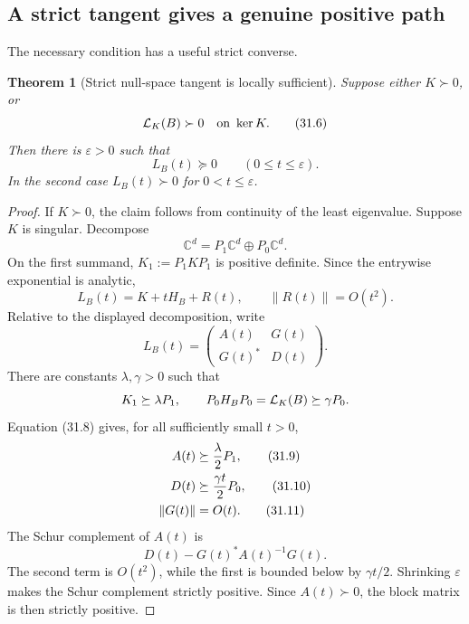 \documentclass[11pt]{article}
\newtheorem{theorem}{Theorem}[section]
\theoremstyle{remark}
\begin{document}
\subsection{A strict tangent gives a genuine positive path}

The necessary condition has a useful strict converse.

\begin{theorem}[Strict null-space tangent is locally sufficient]
\label{thm:v12v31-tangent-sufficient}
Suppose either \(K\succ0\), or
\begin{equation}
 {\cal L}_K(B)\succ0\quad\text{on }\ker K.         \tag{31.6}
\end{equation}
Then there is \(\varepsilon>0\) such that
\begin{equation}
 L_B(t)\succeq0\qquad(0\leq t\leq\varepsilon).
                                                               \tag{31.7}
\end{equation}
In the second case \(L_B(t)\succ0\) for \(0<t\leq\varepsilon\).
\end{theorem}

\begin{proof}
If \(K\succ0\), the claim follows from continuity of the least
eigenvalue.  Suppose \(K\) is singular.  Decompose
\[
 {\mathbb C}^d=P_1{\mathbb C}^d\oplus P_0{\mathbb C}^d.
\]
On the first summand, \(K_1:=P_1KP_1\) is positive definite.  Since
the entrywise exponential is analytic,
\begin{equation}
 L_B(t)=K+tH_B+R(t),\qquad \|R(t)\|=O(t^2).        \tag{31.8}
\end{equation}
Relative to the displayed decomposition, write
\[
 L_B(t)=
 \begin{pmatrix}
 A(t)&G(t)\\G(t)^*&D(t)
 \end{pmatrix}.
\]
There are constants \(\lambda,\gamma>0\) such that
\[
 K_1\succeq\lambda P_1,
 \qquad
 P_0H_BP_0={\cal L}_K(B)\succeq\gamma P_0.
\]
Equation (31.8) gives, for all sufficiently small \(t>0\),
\begin{align}
 A(t)&\succeq{\lambda\over2}P_1,                 \tag{31.9}\\
 D(t)&\succeq{\gamma t\over2}P_0,                \tag{31.10}\\
 \|G(t)\|&=O(t).                                 \tag{31.11}
\end{align}
The Schur complement of \(A(t)\) is
\[
 D(t)-G(t)^*A(t)^{-1}G(t).
\]
The second term is \(O(t^2)\), while the first is bounded below by
\(\gamma t/2\).  Shrinking \(\varepsilon\) makes the Schur complement
strictly positive.  Since \(A(t)\succ0\), the block matrix is then
strictly positive.
\end{proof}
\end{document}
